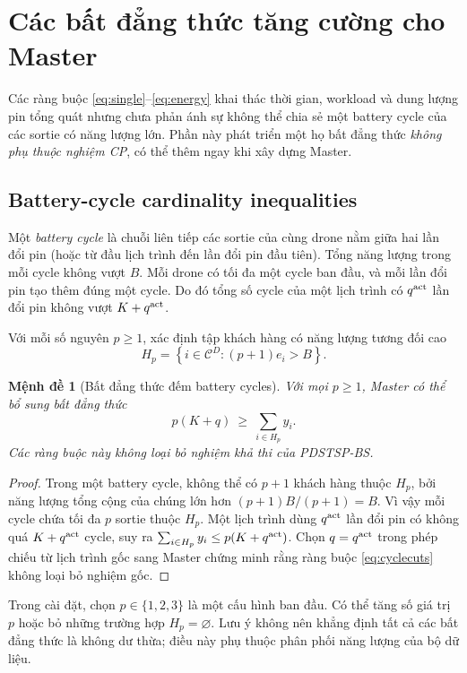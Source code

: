 \documentclass[11pt,a4paper]{article}
\theoremstyle{definition}
\theoremstyle{plain}
\newtheorem{proposition}{Mệnh đề}[section]
\theoremstyle{remark}
\newcommand{\CD}{\mathcal C^D}
\begin{document}
\section{Các bất đẳng thức tăng cường cho Master}
\label{sec:strength}
Các ràng buộc \eqref{eq:single}--\eqref{eq:energy} khai thác thời gian, workload và dung lượng pin tổng quát nhưng chưa phản ánh sự không thể chia sẻ một battery cycle của các sortie có năng lượng lớn. Phần này phát triển một họ bất đẳng thức \emph{không phụ thuộc nghiệm CP}, có thể thêm ngay khi xây dựng Master.

\subsection{Battery-cycle cardinality inequalities}
Một \emph{battery cycle} là chuỗi liên tiếp các sortie của cùng drone nằm giữa hai lần đổi pin (hoặc từ đầu lịch trình đến lần đổi pin đầu tiên). Tổng năng lượng trong mỗi cycle không vượt $B$. Mỗi drone có tối đa một cycle ban đầu, và mỗi lần đổi pin tạo thêm đúng một cycle. Do đó tổng số cycle của một lịch trình có $q^{\rm act}$ lần đổi pin không vượt $K+q^{\rm act}$.

Với mỗi số nguyên $p\ge1$, xác định tập khách hàng có năng lượng tương đối cao
\begin{equation}\label{eq:heavy-set}
H_p=\left\{i\in\CD:(p+1)e_i>B\right\}.
\end{equation}
\begin{proposition}[Bất đẳng thức đếm battery cycles]\label{prop:cycle}
Với mọi $p\ge1$, Master có thể bổ sung bất đẳng thức
\begin{equation}\label{eq:cyclecuts}
\boxed{\qquad p(K+q)\ \ge\ \sum_{i\in H_p}y_i.\qquad}
\end{equation}
Các ràng buộc này không loại bỏ nghiệm khả thi của PDSTSP-BS.
\end{proposition}
\begin{proof}
Trong một battery cycle, không thể có $p+1$ khách hàng thuộc $H_p$, bởi năng lượng tổng cộng của chúng lớn hơn $(p+1)B/(p+1)=B$. Vì vậy mỗi cycle chứa tối đa $p$ sortie thuộc $H_p$. Một lịch trình dùng $q^{\rm act}$ lần đổi pin có không quá $K+q^{\rm act}$ cycle, suy ra $\sum_{i\in H_p}y_i\le p(K+q^{\rm act})$. Chọn $q=q^{\rm act}$ trong phép chiếu từ lịch trình gốc sang Master chứng minh rằng ràng buộc \eqref{eq:cyclecuts} không loại bỏ nghiệm gốc.\end{proof}

Trong cài đặt, chọn $p\in\{1,2,3\}$ là một cấu hình ban đầu. Có thể tăng số giá trị $p$ hoặc bỏ những trường hợp $H_p=\varnothing$. Lưu ý không nên khẳng định tất cả các bất đẳng thức là không dư thừa; điều này phụ thuộc phân phối năng lượng của bộ dữ liệu.
\end{document}
